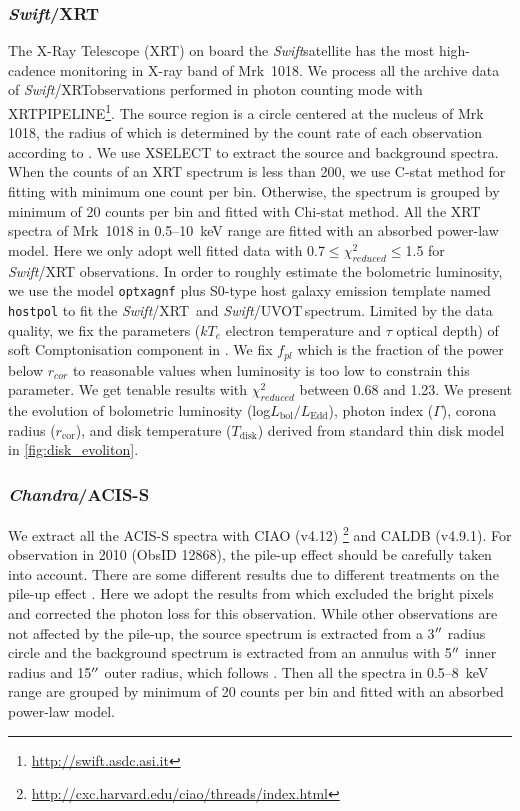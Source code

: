 \documentclass[twocolumn]{aastex63}
\newcommand{\chandra}{{\em Chandra}}
\newcommand{\swift}{{\small \it Swift}}
\newcommand{\xrt}{{\small {\it Swift}/XRT}}
\newcommand{\uvot}{{\small {\it Swift}/UVOT}}
\begin{document}
\subsubsection{\xrt}
The X-Ray Telescope (XRT) on board the \swift satellite has the most high-cadence monitoring in X-ray band of Mrk~1018. We process all the archive data of \xrt observations performed in photon counting mode with {\scriptsize XRTPIPELINE}\footnote{\url{http://swift.asdc.asi.it}}. The source region is a circle centered at the nucleus of Mrk 1018, the radius of which is determined by the count rate of each observation according to \citet{2009MNRAS.397.1177E}. We use {\scriptsize XSELECT} to extract the source and background spectra. When the counts of an XRT spectrum is less than 200, we use C-stat method for fitting with minimum one count per bin. Otherwise, the spectrum is grouped by minimum of 20 counts per bin and fitted with Chi-stat method. All the XRT spectra of Mrk~1018 in 0.5--10~keV range are fitted with an absorbed power-law model. Here we only adopt well fitted data with 0.7$\le \chi^2_{reduced} \le$1.5 for \swift/XRT observations. In order to roughly estimate the bolometric luminosity, we use the model \texttt{optxagnf} plus S0-type host galaxy
emission template named \texttt{hostpol} to fit the \xrt\, and \uvot \,spectrum. Limited by the data quality, we fix the parameters ($kT_e$ electron temperature and $\tau$ optical depth) of soft Comptonisation component in \citep{2018MNRAS.480.3898N}. We fix $f_{pl}$ which is the fraction of the power below $r_{cor}$ to reasonable values when luminosity is too low to constrain this parameter. We get tenable results with $\chi^2_{reduced}$ between 0.68 and 1.23. We present the evolution of bolometric luminosity (log$L_\mathrm{bol}/L_\mathrm{Edd}$), photon index ($\Gamma$), corona radius ($r_\mathrm{cor}$), and disk temperature ($T_\mathrm{disk}$) derived from standard thin disk model in \autoref{fig:disk_evoliton}.


\subsubsection{\chandra/ACIS-S}
We extract all the ACIS-S spectra with CIAO (v4.12) \footnote{\url{http://cxc.harvard.edu/ciao/threads/index.html}} and {\scriptsize CALDB} (v4.9.1).  For observation in 2010 (ObsID 12868), the pile-up effect should be carefully taken into account. There are some different results due to different treatments on the pile-up effect \citep[see ][]{2017ApJ...840...11L,2017A&A...607L...9K}. Here we adopt the results from \citet{2016A&A...593L...9H} which excluded the bright pixels and  corrected the photon loss for this observation. While other observations are not affected by the pile-up, the source spectrum is extracted from a 3$\mbox{$^{\prime\prime}$}$ radius circle and the background spectrum is extracted from an annulus with 5$\mbox{$^{\prime\prime}$}$ inner radius and 15$\mbox{$^{\prime\prime}$}$ outer radius, which follows \citet{2017ApJ...840...11L}. Then all the spectra in 0.5--8~keV range are grouped by minimum of 20 counts per bin and fitted with an absorbed power-law model. 
\end{document}
